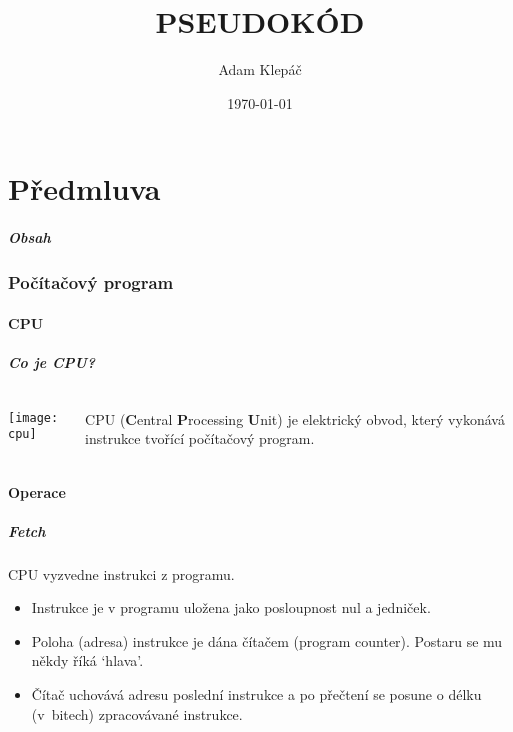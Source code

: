 \documentclass[aspectratio=169,11pt,handout]{beamer}
\title{PSEUDOKÓD}
\date{\today}
\author{Adam Klepáč}
\institute[GEVO]{Gymnázium Evolution Jižní Město}
\begin{document}
\maketitle

\part[Předmluva]{Předmluva}

\begin{frame}
 \partpage
\end{frame}

\begin{frame}
 \frametitle{Obsah}
 \tableofcontents
\end{frame}

\section[Program]{Počítačový program}
\subsection[CPU]{CPU}

\begin{frame}
 \frametitle{Co je CPU?}
 \begin{columns}
  \begin{column}{.3\textwidth}
   \texttt{[image: cpu]}
  \end{column}
  \begin{column}{.7\textwidth}
   \begin{tcolorbox}
    CPU (\textbf{C}entral \textbf{P}rocessing \textbf{U}nit) je elektrický
    obvod, který vykonává \alert{instrukce} tvořící \alert{počítačový program}.
   \end{tcolorbox}
  \end{column}
 \end{columns}
\end{frame}

\subsection[Operace]{Operace}

\begin{frame}
 \frametitle{Fetch}
 \begin{tcolorbox}[title=Fetch,center,width=.95\textwidth]
  CPU \alert{vyzvedne} instrukci z programu.
 \end{tcolorbox}
 \begin{itemize}
  \item Instrukce je v programu uložena jako posloupnost nul a jedniček.
  \item Poloha (adresa) instrukce je dána čítačem (program counter). Postaru se
   mu někdy říká `hlava'.
  \item Čítač uchovává adresu poslední instrukce a po přečtení se posune o délku
   (v~bitech) zpracovávané instrukce.
 \end{itemize}
\end{frame}
\end{document}

